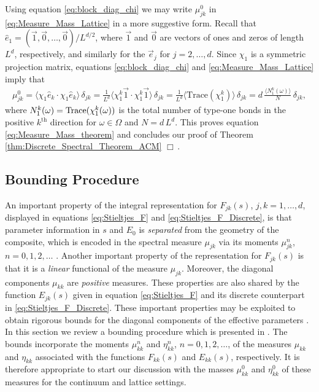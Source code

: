 \documentclass{cmslatex}
\begin{document}
Using equation \eqref{eq:block_diag_chi} we may write
$\mu^0_{jk}$ in \eqref{eq:Measure_Mass_Lattice} in a more suggestive
form. Recall that $\hat{e}_1=(\vec{1},\vec{0},\ldots,\vec{0})/L^{d/2}$,
where $\vec{1}$ and $\vec{0}$ are vectors of ones and zeros of length
$L^d$, respectively, and similarly for the $\vec{e}_j$ for
$j=2,\ldots,d$. Since $\chi_1$ is a symmetric projection matrix, equations 
\eqref{eq:block_diag_chi} and \eqref{eq:Measure_Mass_Lattice} imply
that 
%
\begin{align}\label{eq:Measure_Mass_Lattice_Trace}
  \mu^0_{jk}%
       =\langle\chi_1\hat{e}_k\cdot\chi_1\hat{e}_k\rangle\,\delta_{jk}
       =\frac{1}{L^d}\langle\chi_1^k\vec{1}\cdot \chi_1^k\vec{1}\rangle\,\delta_{jk}
       =\frac{1}{L^d}\langle\text{Trace}(\chi_1^k)\rangle\,\delta_{jk}
       =d\,\frac{\langle N_1^k(\omega)\rangle}{N}\,\delta_{jk},       
\end{align}
%
where $N_1^k(\omega)={\rm Trace}(\chi_1^k(\omega))$ is the total number of type-one
bonds in the positive $k^{\text{th}}$ direction for $\omega\in\Omega$ and
$N=d\,L^d$. This proves equation \eqref{eq:Measure_Mass_theorem} and
concludes our proof of Theorem \ref{thm:Discrete_Spectral_Theorem_ACM}
$\Box\,$.       

\subsection{Bounding Procedure}\label{sec:Bounding_Procedure}
%
An important property of the integral representation for $F_{jk}(s)$,
$j,k=1,\ldots,d$, displayed in equations \eqref{eq:Stieltjes_F} and
\eqref{eq:Stieltjes_F_Discrete}, is that parameter information in $s$
and $E_0$ is \emph{separated} from the geometry of the composite,
which is encoded in the spectral measure $\mu_{jk}$ via its moments  
$\mu^n_{jk}$, $n=0,1,2,\ldots$ \cite{Bruno:JSP-365,Golden:CMP-473}. Another
important property of the representation for $F_{jk}(s)$ is that it
is a \emph{linear} functional of the measure $\mu_{jk}$. Moreover, the
diagonal components $\mu_{kk}$ are \emph{positive} measures. These
properties are also shared by the function $E_{jk}(s)$ given in
equation \eqref{eq:Stieltjes_F} and its discrete counterpart in
\eqref{eq:Stieltjes_F_Discrete}. These important properties may be
exploited to obtain rigorous bounds for the diagonal components of the
effective parameters
\cite{Bergman:PRC-377,Bergman:PRL-1285,Milton:APL-300,Golden:CMP-473,Bergman:AP-78}. 
In this section we review a bounding procedure which is presented in 
\cite{Golden:CMP-473,Golden:1986:BCP}. The bounds incorporate the
moments $\mu_{kk}^n$ and $\eta_{kk}^n$, $n=0,1,2,\ldots$, of the measures
$\mu_{kk}$ and $\eta_{kk}$ associated with the functions $F_{kk}(s)$ and
$E_{kk}(s)$, respectively. It is therefore appropriate to start our
discussion with the masses $\mu_{kk}^0$ and $\eta_{kk}^0$ of these measures
for the continuum and lattice settings. 
\end{document}
